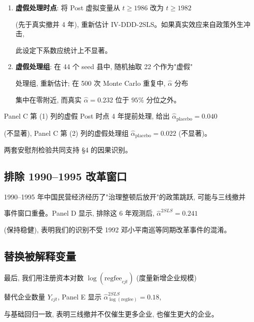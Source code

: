 \begin{enumerate}

\item \textbf{虚假处理时点}: 将 Post 虚拟变量从 $t\geq 1986$ 改为 $t\geq 1982$

       (先于真实撤并 4 年), 重新估计 IV-DDD-2SLS。如果真实效应来自政策外生冲击,

       此设定下系数应统计上不显著。

\item \textbf{虚假处理组}: 在 44 个 seed 县中, 随机抽取 22 个作为"虚假"

       处理组, 重新估计; 在 500 次 Monte Carlo 重复中, $\hat{\alpha}$ 分布

       集中在零附近, 而真实 $\hat{\alpha}=0.232$ 位于 $95\%$ 分位之外。

\end{enumerate}



Panel C 第 (1) 列的虚假 Post 时点 4 年提前处理, 给出 $\hat{\alpha}_{\mathrm{placebo}}=0.040$

(不显著), Panel C 第 (2) 列的虚假处理组 $\hat{\alpha}_{\mathrm{placebo}}=0.022$ (不显著)。

两套安慰剂检验共同支持 §4 的因果识别。



\subsection{排除 1990--1995 改革窗口}



1990--1995 年中国民营经济经历了"治理整顿后放开"的政策跳跃, 可能与三线撤并

事件窗口重叠。Panel D 显示, 排除这 6 年观测后, $\hat{\alpha}^{2SLS}=0.241$

(保持稳健), 表明我们的识别不受 1992 邓小平南巡等同期改革事件的混淆。



\subsection{替换被解释变量}



最后, 我们用注册资本对数 $\log(\mathrm{regfee}_{cjt})$ (度量新增企业规模) 

替代企业数量 $Y_{cjt}$, Panel E 显示 $\hat{\alpha}^{2SLS}_{\log(\mathrm{regfee})}=0.18$,

与基础回归一致, 表明三线撤并不仅催生更多企业, 也催生更大的企业。



